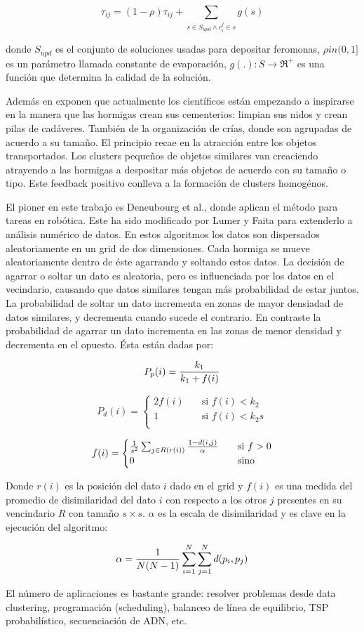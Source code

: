 \begin{itemize}
\[
\tau_{ij} = (1-\rho)\tau_{ij} + \sum_{s \in S_{upd} \land c_i^j \in s} g(s)
\]

donde $S_{upd}$ es el conjunto de soluciones usadas para depositar feromonas, 
$\rho in (0,1]$ es un par\'ametro llamada constante de evaporaci\'on,
$g(.):S \rightarrow  \Re^+$ es una funci\'on que determina la calidad
de la soluci\'on.
\end{itemize}

Adem\'as en \cite{OuBa2007} exponen que actualmente los cient\'ificos est\'an 
empezando a inspirarse en la manera que las hormigas crean sus cementerios: limpian sus nidos
y crean pilas de cad\'averes. 
Tambi\'en de la organizaci\'on de cr\'ias, donde son agrupadas
de acuerdo a su tama\~no. El principio recae en la atracci\'on
entre los objetos transportados. Los clusters pequeños de objetos
similares van creaciendo atrayendo a las hormigas a despositar m\'as
objetos de acuerdo con su tama\~no o tipo. Este feedback positivo
conlleva a la formaci\'on de clusters homog\'enos.

El pioner en este trabajo es Deneubourg et al., donde aplican el
m\'etodo para tareas en rob\'otica. Este ha sido modificado por Lumer
y Faita para extenderlo a an\'alisis num\'erico de datos.
En estos algoritmos los datos son dispersados aleatoriamente
en un grid de dos dimensiones. Cada hormiga se mueve aleatoriamente
dentro de \'este agarrando y soltando estos datos. La decisi\'on
de agarrar o soltar un dato es aleatoria,
pero es influenciada por los datos en el vecindario, 
causando que datos similares tengan m\'as probabilidad de
estar juntos. La probabilidad de soltar un dato incrementa
en zonas de mayor densiadad de datos similares, y decrementa
cuando sucede el contrario.  En contraste
la probabilidad de agarrar un dato incrementa en las zonas de
menor densidad y decrementa en el opuesto.
\'Esta est\'an dadas por:

\[
P_p(i) = {k_1 \over {k_1 + f(i)}}
\]

\[
P_d(i) = 
  \begin{cases}
    2f(i) & \quad \text{si $f(i)<k_2$}\\
    1     & \quad \text{si $f(i) < k_2s$}\\
  \end{cases}
\]

\[
f(i) =
  \begin{cases}
    {{1} \over {s^2}} \sum_{j \in R(r(i))} {{1 - {d(i,j)}} \over \alpha} & \quad \text{si $f > 0$}\\
    0     & \quad \text{sino}
  \end{cases} 
\]

Donde $r(i)$ es la posici\'on del dato $i$ dado en el grid y $f(i)$ es una medida
del promedio de disimilaridad del dato $i$ con respecto a los otros $j$
presentes en su vencindario $R$ con tama\~no $s \times s$. $\alpha$
es la escala de disimilaridad y es clave en la ejecuci\'on del algoritmo:

\[
\alpha = {{1 \over {N(N-1)}} \sum_{i=1}^N \sum_{j=1}^N d(p_i,p_j)}
\]

El n\'umero de aplicaciones es bastante grande: resolver problemas
desde data clustering, programaci\'on (scheduling), balanceo
de l\'inea de equilibrio, TSP probabil\'istico, secuenciaci\'on de 
ADN, etc. \cite{GePo2010}
